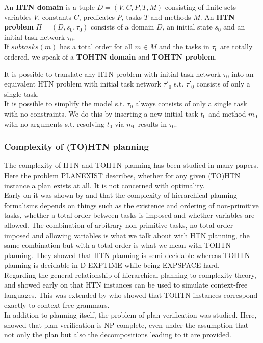 \begin{definition} %
	An \textbf{HTN domain} is a tuple $D = (V, C, P, T, M)$ consisting of finite sets variables $V$, constants $C$, predicates $P$, tasks $T$ and methods $M$. An \textbf{HTN problem} $\Pi = (D, s_0, \tau_0)$ consists of a domain $D$, an initial state $s_0$ and an initial task network $\tau_0$. \\
	If $subtasks(m)$ has a total order for all $m \in M$ and the tasks in $\tau_0$ are totally ordered, we speak of a \textbf{TOHTN domain} and \textbf{TOHTN problem}.
\end{definition}
It is possible to translate any HTN problem with initial task network $\tau_0$ into an equivalent HTN problem with initial task network $\tau'_0$ s.t. $\tau'_0$ consists of only a single task. \\
It is possible to simplify the model s.t. $\tau_0$ always consists of only a single task with no constraints. We do this by inserting a new initial task $t_0$ and method $m_0$ with no arguments s.t. resolving $t_0$ via $m_0$ results in $\tau_0$.

\subsubsection{Complexity of (TO)HTN planning}
\label{prelim: tohtn complexity}
The complexity of HTN and TOHTN planning has been studied in many papers. Here the problem PLANEXIST describes, whether for any given (TO)HTN instance a plan exists at all. It is not concerned with optimality. \\
Early on it was shown by \cite{erol1994htn} and \cite{erol1996complexity} that the complexity of hierarchical planning formalisms depends on things such as the existence and ordering of non-primitive tasks, whether a total order between tasks is imposed and whether variables are allowed. The combination of arbitrary non-primitive tasks, no total order imposed and allowing variables is what we talk about with HTN planning, the same combination but with a total order is what we mean with TOHTN planning. They showed that HTN planning is semi-decidable whereas TOHTN planning is decidable in D-EXPTIME while being EXPSPACE-hard. \\
Regarding the general relationship of hierarchical planning to complexity theory, \cite{erol1994htn} and \cite{erol1996complexity} showed early on that HTN instances can be used to simulate context-free languages. This was extended by \cite{holler2014language} who showed that TOHTN instances correspond exactly to context-free grammars. \\
In addition to planning itself, the problem of plan verification was studied. Here, \cite{behnke2015complexity} showed that plan verification is NP-complete, even under the assumption that not only the plan but also the decompositions leading to it are provided.

